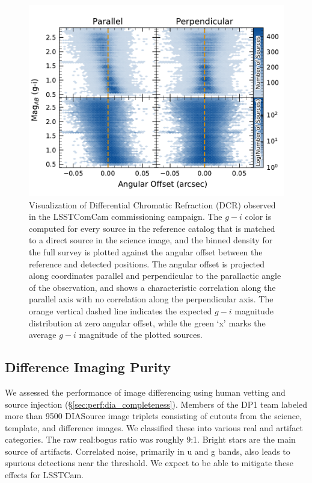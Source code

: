 \begin{figure}[htb!]
\centering
\includegraphics[width=0.98\linewidth]{dcrHexbin.pdf}
\caption{Visualization of Differential Chromatic Refraction (DCR) observed in the  LSSTComCam commissioning campaign. The $g-i$ color is computed for every source in the reference catalog that is matched to a direct source in the science image, and the binned density for the full survey is plotted against the angular offset between the reference and detected positions. The angular offset is projected along coordinates parallel and perpendicular to the parallactic angle of the observation, and shows a characteristic correlation along the parallel axis with no correlation along the perpendicular axis. The orange vertical dashed line indicates the expected $g-i$ magnitude distribution at zero angular offset, while the green ‘x’ marks the average $g-i$ magnitude of the plotted sources.}
\label{fig:dcr}
\vspace{0.1cm}
\end{figure}


\subsection{Difference Imaging Purity} \label{sec:performance:dia}

We assessed the performance of image differencing using human vetting and source injection (\S \ref{sec:perf:dia_completeness}).  
Members of the DP1 team labeled more than 9500 DIASource image triplets consisting of cutouts from the science, template, and difference images.  
We classified these into various real and artifact categories.
The raw real:bogus ratio was roughly 9:1.
Bright stars are the main source of artifacts.
Correlated noise, primarily in u and g bands, also leads to spurious detections near the threshold.
We expect to be able to mitigate these effects for LSSTCam.

